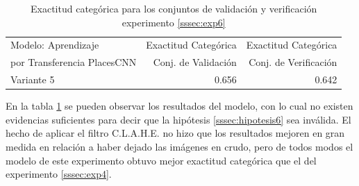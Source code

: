 \begin{table}[h!]
	\centering
	\begin{tabular}{| l | r | r |}
		\toprule
		Modelo: Aprendizaje & Exactitud Categórica &  Exactitud Categórica \\
		por Transferencia PlacesCNN & Conj. de Validación &  Conj. de Verificación \\
		\midrule
		Variante 5 & 0.656 & 0.642 \\
		\bottomrule
	\end{tabular}
	\caption{Exactitud categórica para los conjuntos de validación y verificación experimento \ref{sssec:exp6}}
	\label{exp6:results}
\end{table}

En la tabla \ref{exp6:results} se pueden observar los resultados del modelo, con lo cual no existen evidencias suficientes para decir que la hipótesis \ref{sssec:hipotesis6} sea inválida. El hecho de aplicar el filtro C.L.A.H.E. no hizo que los resultados mejoren en gran medida en relación a haber dejado las imágenes en crudo, pero de todos modos el modelo de este experimento obtuvo mejor exactitud categórica que el del experimento \ref{sssec:exp4}.	